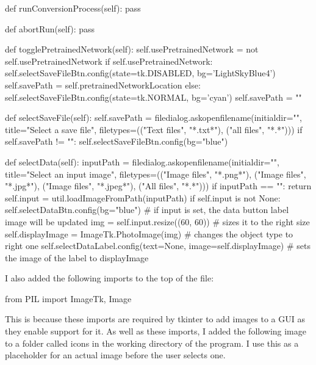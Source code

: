 \documentclass{report}
\begin{document}
\begin{python}
    def runConversionProcess(self):
        pass

    def abortRun(self):
        pass

    def togglePretrainedNetwork(self):
        self.usePretrainedNetwork = not self.usePretrainedNetwork
        if self.usePretrainedNetwork:
            self.selectSaveFileBtn.config(state=tk.DISABLED, bg='LightSkyBlue4')
            self.savePath = self.pretrainedNetworkLocation
        else:
            self.selectSaveFileBtn.config(state=tk.NORMAL, bg='cyan')
            self.savePath = ""

    def selectSaveFile(self):
        self.savePath = filedialog.askopenfilename(initialdir="",
                                        title="Select a save file",
                                        filetypes=(("Text files", "*.txt*"),
                                        ("all files", "*.*")))
        if self.savePath != "":
            self.selectSaveFileBtn.config(bg="blue")

    def selectData(self):
        inputPath = filedialog.askopenfilename(initialdir="",
                                        title="Select an input image",
                                        filetypes=(("Image files", "*.png*"), 
                                        ("Image files", "*.jpg*"), 
                                        ("Image files", "*.jpeg*"),
                                        ("All files", "*.*")))
        if inputPath == "":
            return
        self.input = util.loadImageFromPath(inputPath)
        if self.input is not None:
            self.selectDataBtn.config(bg="blue")
            #  if input is set, the data button label image will be updated
            img = self.input.resize((60, 60))  # sizes it to the right size
            self.displayImage = ImageTk.PhotoImage(img)  # changes the object type to right one
            self.selectDataLabel.config(text=None, image=self.displayImage)  # sets the image of the label to displayImage
\end{python}
I also added the following imports to the top of the file: 
\begin{python}
from PIL import ImageTk, Image
\end{python}
This is because these imports are required by tkinter to add images to a GUI as they enable support for it. As well as these imports, I added the following image to a folder called icons in the working directory of the program. I use this as a placeholder for an actual image before the user selects one. 
\begin{figure}[H]
    \centering
\end{figure}
\end{document}
